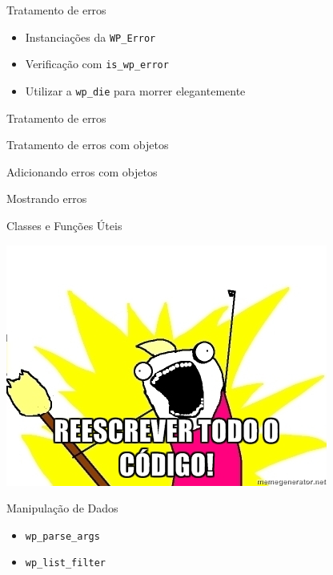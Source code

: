 \documentclass{beamer}
\begin{document}
\begin{frame}{Tratamento de erros}
\begin{itemize}
  \pause \item Instanciações da \texttt{WP\_Error}
  \pause \item Verificação com \texttt{is\_wp\_error}
  \pause \item Utilizar a \texttt{wp\_die} para morrer elegantemente
\end{itemize}
\end{frame}

\begin{frame}{Tratamento de erros}
  
\end{frame}

\begin{frame}{Tratamento de erros com objetos}
  
\end{frame}

\begin{frame}{Adicionando erros com objetos}
  
\end{frame}

\begin{frame}{Mostrando erros}
  
  \pause 
\end{frame}

\begin{frame}{Classes e Funções Úteis}
\begin{center}
  \includegraphics[height=0.8\textheight]{./img/rewrite.jpg}
\end{center}
\end{frame}

\begin{frame}{Manipulação de Dados}
\begin{itemize}
  \pause \item \texttt{wp\_parse\_args}
  \pause \item \texttt{wp\_list\_filter}
\end{itemize}
\end{frame}
\end{document}
